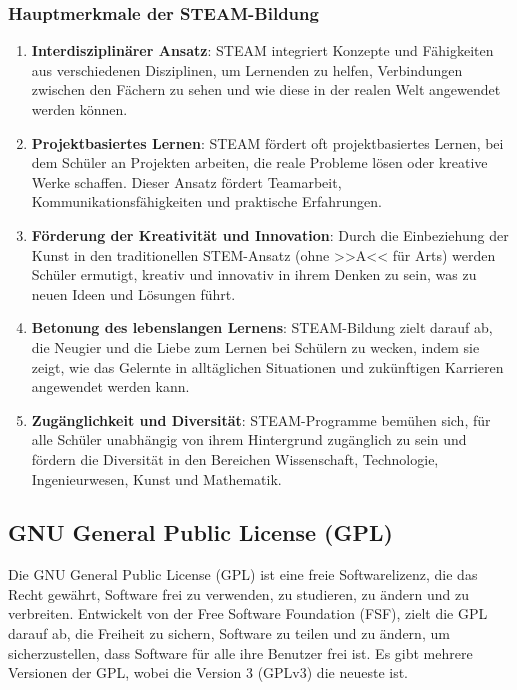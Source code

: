\documentclass{vorlage-design-main}
\begin{document}
\hypertarget{hauptmerkmale-der-steam-bildung}{%
\subsubsection{Hauptmerkmale der
STEAM-Bildung}\label{hauptmerkmale-der-steam-bildung}}

\begin{enumerate}
\def\labelenumi{\arabic{enumi}.}
\item
  \textbf{Interdisziplinärer Ansatz}: STEAM integriert Konzepte und
  Fähigkeiten aus verschiedenen Disziplinen, um Lernenden zu helfen,
  Verbindungen zwischen den Fächern zu sehen und wie diese in der realen
  Welt angewendet werden können.
\item
  \textbf{Projektbasiertes Lernen}: STEAM fördert oft projektbasiertes
  Lernen, bei dem Schüler an Projekten arbeiten, die reale Probleme
  lösen oder kreative Werke schaffen. Dieser Ansatz fördert Teamarbeit,
  Kommunikationsfähigkeiten und praktische Erfahrungen.
\item
  \textbf{Förderung der Kreativität und Innovation}: Durch die
  Einbeziehung der Kunst in den traditionellen STEM-Ansatz (ohne >>A<<
  für Arts) werden Schüler ermutigt, kreativ und innovativ in ihrem
  Denken zu sein, was zu neuen Ideen und Lösungen führt.
\item
  \textbf{Betonung des lebenslangen Lernens}: STEAM-Bildung zielt darauf
  ab, die Neugier und die Liebe zum Lernen bei Schülern zu wecken, indem
  sie zeigt, wie das Gelernte in alltäglichen Situationen und
  zukünftigen Karrieren angewendet werden kann.
\item
  \textbf{Zugänglichkeit und Diversität}: STEAM-Programme bemühen sich,
  für alle Schüler unabhängig von ihrem Hintergrund zugänglich zu sein
  und fördern die Diversität in den Bereichen Wissenschaft, Technologie,
  Ingenieurwesen, Kunst und Mathematik.
\end{enumerate}

\hypertarget{gnu-general-public-license-gpl}{%
\subsection{GNU General Public License
(GPL)}\label{gnu-general-public-license-gpl}}

Die GNU General Public License (GPL) ist eine freie Softwarelizenz, die
das Recht gewährt, Software frei zu verwenden, zu studieren, zu ändern
und zu verbreiten. Entwickelt von der Free Software Foundation (FSF),
zielt die GPL darauf ab, die Freiheit zu sichern, Software zu teilen und
zu ändern, um sicherzustellen, dass Software für alle ihre Benutzer frei
ist. Es gibt mehrere Versionen der GPL, wobei die Version 3 (GPLv3) die
neueste ist.
\end{document}
